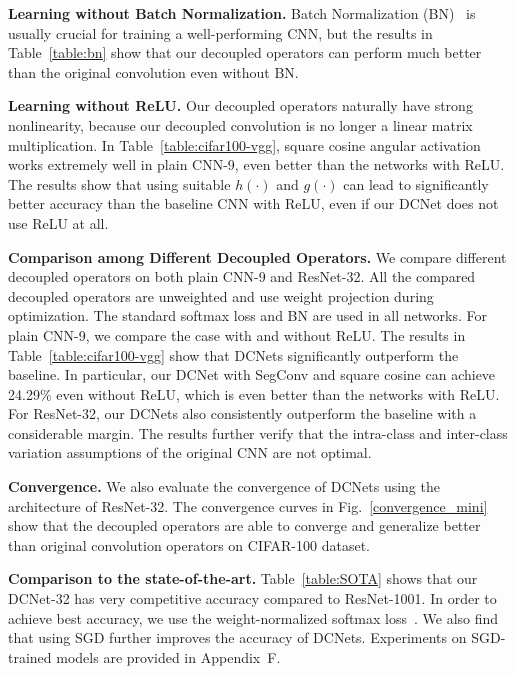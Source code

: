 \par

\textbf{Learning without Batch Normalization.} Batch Normalization (BN)~\cite{ioffe2015batch} is usually crucial for training a well-performing CNN, but the results in Table~\ref{table:bn} show that our decoupled operators can perform much better than the original convolution even without BN.
\par

\textbf{Learning without ReLU.} Our decoupled operators naturally have strong nonlinearity, because our decoupled convolution is no longer a linear matrix multiplication. In Table~\ref{table:cifar100-vgg}, square cosine angular activation works extremely well in plain CNN-9, even better than the networks with ReLU. The results show that using suitable $h(\cdot)$ and $g(\cdot)$ can lead to significantly better accuracy than the baseline CNN with ReLU, even if our DCNet does not use ReLU at all.

\textbf{Comparison among Different Decoupled Operators.} We compare different decoupled operators on both plain CNN-9 and ResNet-32. All the compared decoupled operators are unweighted and use weight projection during optimization. The standard softmax loss and BN are used in all networks. For plain CNN-9, we compare the case with and without ReLU. The results in Table~\ref{table:cifar100-vgg} show that DCNets significantly outperform the baseline. In particular, our DCNet with SegConv and square cosine can achieve 24.29\% even without ReLU, which is even better than the networks with ReLU. For ResNet-32, our DCNets also consistently outperform the baseline with a considerable margin. The results further verify that the intra-class and inter-class variation assumptions of the original CNN are not optimal.

\par

\textbf{Convergence.} We also evaluate the convergence of DCNets using the architecture of ResNet-32. The convergence curves in Fig.~\ref{convergence_mini} show that the decoupled operators are able to converge and generalize better than original convolution operators on CIFAR-100 dataset.
\par

\textbf{Comparison to the state-of-the-art.} Table~\ref{table:SOTA} shows that our DCNet-32 has very competitive accuracy compared to ResNet-1001. In order to achieve best accuracy, we use the weight-normalized softmax loss~\cite{liu2017deephyper}. We also find that using SGD further improves the accuracy of DCNets. Experiments on SGD-trained models are provided in Appendix~\textcolor[rgb]{0.7551,0.2333,0.3333}{F}.

